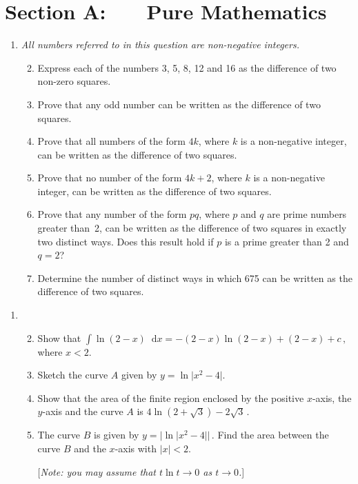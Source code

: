 \documentclass[a4, 11pt]{report}
\newlength{\qspace}
\newcounter{qnumber}
\newenvironment{question}%
 {\vspace{\qspace}
  \begin{enumerate}[\bfseries 1\quad][10]%
    \setcounter{enumi}{\value{qnumber}}%
    \item%
 }
{
  \end{enumerate}
  \filbreak
  \stepcounter{qnumber}
 }
\newenvironment{questionparts}[1][1]%
 {
  \begin{enumerate}[\bfseries (i)]%
    \setcounter{enumii}{#1}
    \addtocounter{enumii}{-1}
    \setlength{\itemsep}{5mm}
    \setlength{\parskip}{8pt}
 }
 {
  \end{enumerate}
 }
\renewcommand{\.}[1]{\ensuremath{\mathrm{#1}}}
\newcommand{\+}[1]{\ensuremath{\mathbf{#1}}}
\newcommand{\ud}{\mathop{}\!\mathrm{d}}
\begin{document}
\setcounter{page}{2}

 
\section*{Section A: \ \ \ Pure Mathematics}

\begin{question}
 \emph{All numbers referred to in this question are non-negative
    integers.}

\begin{questionparts}
\item Express each of the numbers 3, 5, 8, 12 and 16 as the
    difference of two non-zero squares.
\item Prove that any odd number can be written as the difference of
    two squares.
\item Prove that all numbers of the form $4k$, where $k$ is a non-negative
integer, can be written as the
    difference of two squares.
\item Prove that no number of the form $4k+2$, where $k$ is a non-negative
integer,  can be written as the
    difference of two squares. 
	
\item Prove that any number of the form $pq$, where $p$ and $q$ are prime
numbers greater than~2, can be written as the difference of two
squares in exactly two distinct ways. Does this result hold if 
$p$ is a prime greater than 2 and $q=2$?

\item Determine the number of  distinct ways  in which 
675 can be written as the difference of 
two squares.

\end{questionparts}
\end{question}

\begin{question}
\begin{questionparts}
\item
Show that $\int \ln (2-x) \ud x = -(2-x)\ln (2-x) + (2-x) + c \,,\  $ 
where $x<2$.

\item
  Sketch the curve  $A$ given by
$y= \ln \vert x^2-4\vert$.

  \item Show that the area of the finite region enclosed by the 
positive $x$-axis, the
    $y$-axis and the curve $A$ is $4\ln(2+\sqrt3)-2\sqrt3\,$.

  \item The curve $B$ is given by 
$y= \big\vert \ln \vert x^2-4\vert \big\vert\,$.
Find the area between the curve $B$
and the $x$-axis with $| x| <2$. 
 
[\textit{Note:
    you may assume that $t \ln t \to 0$ as $t\to 0$.}]

  \end{questionparts}
\end{question}
\end{document}
